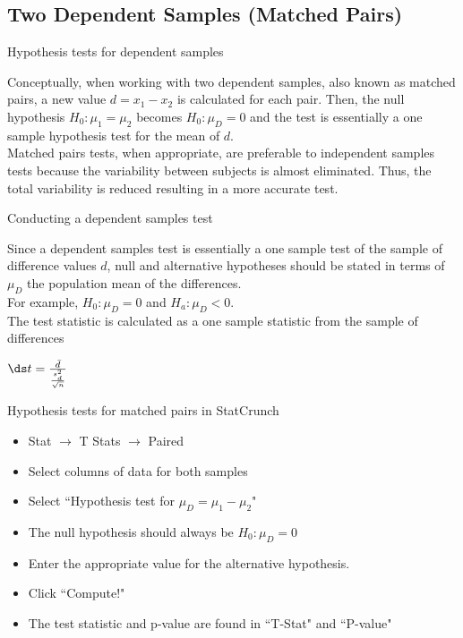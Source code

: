 \documentclass[xcolor=table, handout]{beamer}
\begin{document}
\subsection{Two Dependent Samples (Matched Pairs)}

\begin{frame}{Hypothesis tests for dependent samples}
\begin{block}{}
\large
Conceptually, when working with two dependent samples, also known as matched pairs, a new value $d = x_1 - x_2$ is calculated for each pair. Then, the null hypothesis $H_0: \mu_1 = \mu_2$ becomes $H_0: \mu_D = 0$ and the test is essentially a one sample hypothesis test for the mean of $d$.\\
\pause\medskip
Matched pairs tests, when appropriate, are preferable to independent samples tests because the variability between subjects is almost eliminated. Thus, the total variability is reduced resulting in a more accurate test. 
\end{block}
\end{frame}

\begin{frame}{Conducting a dependent samples test}
\begin{block}{}
\large
Since a dependent samples test is essentially a one sample test of the sample of difference values $d$, null and alternative hypotheses should be stated in terms of $\mu_D$ the population mean of the differences.\\
\pause\medskip
For example, $H_0: \mu_D = 0$ and $H_a: \mu_D < 0$.\\
\pause\medskip
The test statistic is calculated as a one sample statistic from the sample of differences\\
\medskip
{\centering $\ds t = \frac {\bar d}{\frac{s_d^2}{\sqrt{n}}}$ \par}
\medskip
\end{block}
\end{frame}

\begin{frame}{Hypothesis tests for matched pairs in StatCrunch}

\begin{block}{}
\large
\begin{itemize}
\item Stat $\to$ T Stats $\to$ Paired
\item Select columns of data for both samples
\item Select ``Hypothesis test for $\mu_D = \mu_1 - \mu_2$"
\item The null hypothesis should always be $H_0: \mu_D = 0$
\item Enter the appropriate value for the alternative hypothesis.
\item Click ``Compute!"
\item The test statistic and p-value are found in ``T-Stat" and ``P-value"
\end{itemize}
\end{block}

\end{frame}
\end{document}
